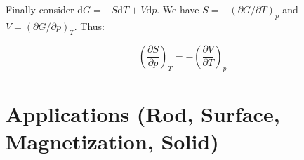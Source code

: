 \documentclass[12pt]{article}
\begin{document}
Finally consider $\mathrm{d}G = -S \mathrm{d}T + V \mathrm{d}p$. We have $S = -(\partial G / \partial T)_{p}$ and $V = (\partial G / \partial p)_{T}$. Thus:

\begin{equation}
    \left( \frac{\partial S}{\partial p} \right)_{T} = -\left( \frac{\partial V}{\partial T} \right)_{p}
\end{equation}

\pagebreak
\section*{Applications (Rod, Surface, Magnetization, Solid)}
\end{document}
